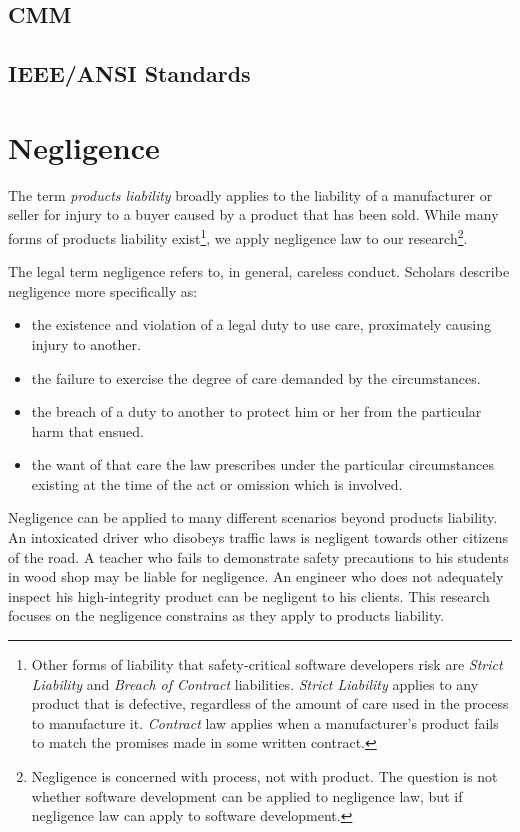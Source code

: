 \subsection{CMM}

\subsection{IEEE/ANSI Standards}

\section{Negligence}\label{S:Negligence}
The term \textit{products liability} broadly applies to the liability of a
manufacturer or seller for injury to a buyer caused by a product that has been
sold. While many forms of products liability exist\footnote{Other forms of
liability that safety-critical software developers risk are \textit{Strict
Liability} and \textit{Breach of Contract} liabilities. \textit{Strict Liability}
applies to any product that is defective, regardless of the amount of care used
in the process to manufacture it. \textit{Contract} law applies when a 
manufacturer's product fails to match the promises made in some written 
contract.}, we apply negligence law to our research\footnote{Negligence is 
concerned with process, not with product. The question is not whether software 
development can be applied to negligence law, but if negligence law can apply to
software development.}.

The legal term negligence refers to, in general, careless conduct. Scholars
describe negligence more specifically as:

\singlespace
\begin{itemize}
 \item the existence and violation of a legal duty to use care, proximately 
 causing injury to another.
 \item the failure to exercise the degree of care demanded by the circumstances.
 \item the breach of a duty to another to protect him or her from the particular
 harm that ensued.
 \item the want of that care the law prescribes under the particular
 circumstances existing at the time of the act or omission which is involved.
\end{itemize}
\doublespace

Negligence can be applied to many different scenarios beyond products
liability. An intoxicated driver who disobeys traffic laws is negligent towards
other citizens of the road. A teacher who fails to demonstrate safety
precautions to his students in wood shop may be liable for negligence. An
engineer who does not adequately inspect his high-integrity product can be
negligent to his clients. This research focuses on the negligence constrains as
they apply to products liability.

